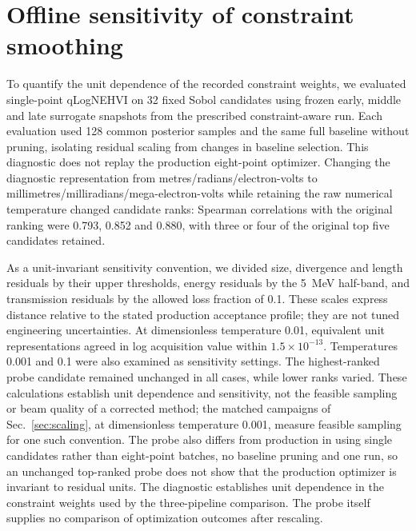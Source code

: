 \documentclass[aps,prab,reprint,superscriptaddress,amsmath,amssymb,floatfix]{revtex4-2}
\begin{document}
\section{Offline sensitivity of constraint smoothing}
\label{app:smoothing}
To quantify the unit dependence of the recorded constraint weights, we evaluated single-point
qLogNEHVI on 32 fixed Sobol candidates using frozen early, middle and late surrogate snapshots
from the prescribed constraint-aware run. Each evaluation used 128 common posterior samples
and the same full baseline without pruning, isolating residual scaling from changes in
baseline selection. This diagnostic does not replay the production eight-point optimizer.
Changing the diagnostic representation from metres/radians/electron-volts to
millimetres/milliradians/mega-electron-volts while retaining the raw numerical temperature
changed candidate ranks: Spearman correlations with the original ranking were
0.793, 0.852 and 0.880, with three or four of the original top five candidates retained.

As a unit-invariant sensitivity convention, we divided size, divergence and length residuals by
their upper thresholds, energy residuals by the \SI{5}{\mega\electronvolt} half-band, and
transmission residuals by the allowed loss fraction of 0.1. These scales express distance
relative to the stated production acceptance profile; they are not tuned engineering
uncertainties. At dimensionless temperature 0.01, equivalent unit representations agreed in log
acquisition value within $1.5\times10^{-13}$. Temperatures 0.001 and 0.1 were also examined as
sensitivity settings. The highest-ranked probe candidate remained unchanged in all cases, while
lower ranks varied. These calculations establish unit dependence and sensitivity, not the
feasible sampling or beam quality of a corrected method; the matched campaigns of
Sec.~\ref{sec:scaling}, at dimensionless temperature 0.001, measure feasible sampling for one
such convention. The probe also differs from production in using single candidates rather than
eight-point batches, no baseline pruning and one run, so an unchanged top-ranked probe does not
show that the production optimizer is invariant to residual units. The diagnostic establishes
unit dependence in the constraint weights used by the three-pipeline comparison. The probe
itself supplies no comparison of optimization outcomes after rescaling.


\end{document}
